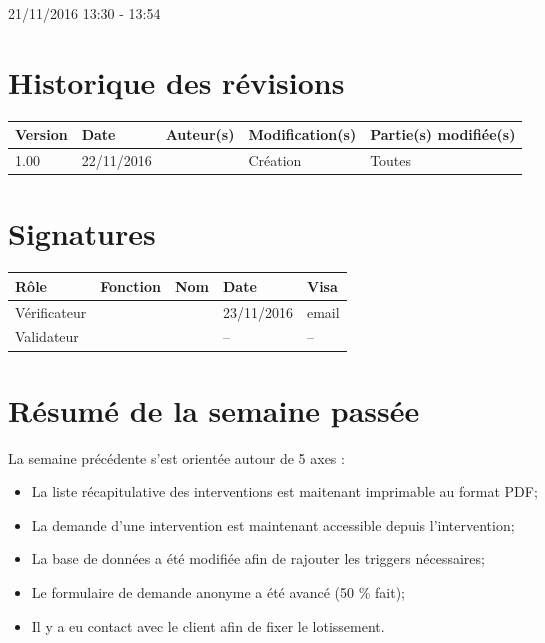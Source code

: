 \documentclass [a4paper] {article}
\begin{document}
21/11/2016			 				%
\hfill   
\hfill 	 13:30 - 13:54				%


\section*{Historique des révisions}
\begin{center}
			\begin{tabular}{| p{2.5cm} | p{3cm} | p{3cm} | p{3cm} | p{3.5cm} |}
				\hline
				\rowcolor{Gray}
				Version & Date & Auteur(s) & Modification(s) & Partie(s) modifiée(s)		 \\
				\hline
				1.00 & 22/11/2016 & \Kafui & Création & Toutes \\
				\hline			
			\end{tabular}
		\end{center}

\section*{Signatures}

		\begin{center}
			\begin{tabular}{| p{2.5cm} | p{4cm} | p{3cm} | p{3cm} | p{2.5cm} |}
				\hline
				\rowcolor{Gray}
				Rôle & Fonction & Nom & Date & Visa		 \\
				\hline
				Vérificateur & \RGC & \Melissa & 23/11/2016 & email \\[30pt]
				\hline
				Validateur & \CP & \Pierre &  -- & -- \\[30pt]	
				\hline
			\end{tabular}
		\end{center}

\section{Résumé de la semaine passée}
La semaine précédente s'est orientée autour de 5 axes :  
\begin{itemize}
	\item La liste récapitulative des interventions est maitenant imprimable au format PDF;
	\item La demande d'une intervention est maintenant accessible depuis l'intervention;
	\item La base de données a été modifiée afin de rajouter les triggers nécessaires;
	\item Le formulaire de demande anonyme a été avancé (50 \% fait);
	\item Il y a eu contact avec le client afin de fixer le lotissement.
\end{itemize} 
\end{document}
